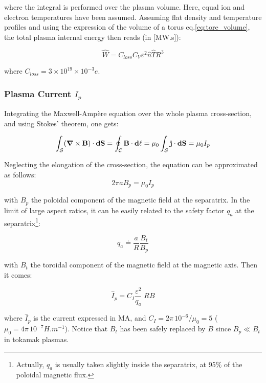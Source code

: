 \noindent
where the integral is performed over the plasma volume. Here, equal ion and electron temperatures have been assumed. Assuming flat density and temperature profiles and using the expression of the volume of a torus eq.\ref{eq:tore_volume}, the total plasma internal energy then reads (in [MW.s]):

\begin{equation}
\boxed{
	\hat W = C_{loss} C_V \varepsilon^2  \hat n \hat T R^3
	\label{eq:total_energy}
}
\end{equation}

\noindent
where $C_{loss} = 3 \times 10^{19} \times 10^{-3} e$.

\subsubsection{Plasma Current $I_p$}

Integrating the Maxwell-Ampère equation over the whole plasma cross-section, and using Stokes' theorem, one gets:

\begin{equation*}
\int_\mathcal{S} (\mbox{\boldmath${\nabla}$}\times {\mathbf B}) \cdot \mathbf{dS} = 
\oint_\mathcal{C} \mathbf{B} \cdot \mathbf{d\ell}
= \mu_0 \int_\mathcal{S} {\mathbf j} \cdot \mathbf{dS} = \mu_0 I_p
\end{equation*}

Neglecting the elongation of the cross-section, the equation can be approximated as follows:
$$
2\pi a B_p = \mu_0 I_p
$$

\noindent
with $B_p$ the poloidal component of the magnetic field at the separatrix. In the limit of large aspect ratios, it can be easily related to the safety factor $q_a$ at the separatrix\footnote{Actually, $q_a$ is usually taken slightly inside the separatrix, at 95$\%$ of the poloidal magnetic flux.}:

\begin{equation*}
q_a \doteq \frac{a}{R} \frac{B_t}{B_p} 
\end{equation*}

\noindent
with $B_t$ the toroidal component of the magnetic field at the magnetic axis. Then it comes:

\begin{equation}
\boxed{\hat I_p = C_I \frac{\varepsilon^2}{q_a} \; R B}
\label{eq:plasma_current}
\end{equation}

\noindent
where $\hat I_p$ is the current expressed in MA, and $C_I = 2\pi\, 10^{-6} /\mu_0 = 5$  ($\mu_0 = 4\pi\, 10^{-7} \si{H.m^{-1}}$).
Notice that $B_t$ has been safely replaced by $B$ since $B_p\ll B_t$ in tokamak plasmas. 

